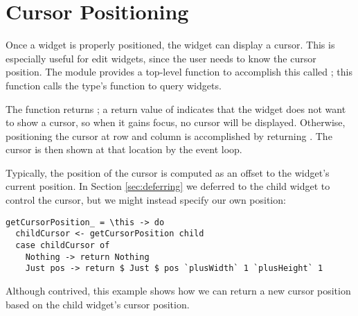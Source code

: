 \section{Cursor Positioning}

Once a widget is properly positioned, the widget can display a cursor.
This is especially useful for edit widgets, since the user needs to
know the cursor position.  The  module provides a top-level
function to accomplish this called ; this
function calls the  type's 
function to query widgets.

The  function returns ;
a return value of  indicates that the widget does not want
to show a cursor, so when it gains focus, no cursor will be displayed.
Otherwise, positioning the cursor at row  and column  is
accomplished by returning .  The cursor
is then shown at that location by the event loop.

Typically, the position of the cursor is computed as an offset to the
widget's current position.  In Section \ref{sec:deferring} we deferred
to the child widget to control the cursor, but we might instead
specify our own position:

\begin{verbatim}
getCursorPosition_ = \this -> do
  childCursor <- getCursorPosition child
  case childCursor of
    Nothing -> return Nothing
    Just pos -> return $ Just $ pos `plusWidth` 1 `plusHeight` 1
\end{verbatim}

Although contrived, this example shows how we can return a new cursor
position based on the child widget's cursor position.
